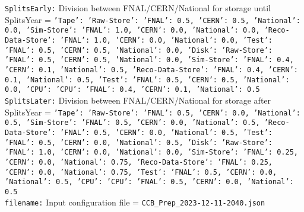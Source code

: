 {\tt SplitsEarly:} Division between FNAL/CERN/National for storage until SplitsYear = {\tt {'Tape': {'Raw-Store': {'FNAL': 0.5, 'CERN': 0.5, 'National': 0.0}, 'Sim-Store': {'FNAL': 1.0, 'CERN': 0.0, 'National': 0.0}, 'Reco-Data-Store': {'FNAL': 1.0, 'CERN': 0.0, 'National': 0.0}, 'Test': {'FNAL': 0.5, 'CERN': 0.5, 'National': 0.0}}, 'Disk': {'Raw-Store': {'FNAL': 0.5, 'CERN': 0.5, 'National': 0.0}, 'Sim-Store': {'FNAL': 0.4, 'CERN': 0.1, 'National': 0.5}, 'Reco-Data-Store': {'FNAL': 0.4, 'CERN': 0.1, 'National': 0.5}, 'Test': {'FNAL': 0.5, 'CERN': 0.5, 'National': 0.0}}, 'CPU': {'CPU': {'FNAL': 0.4, 'CERN': 0.1, 'National': 0.5}}}} \\
{\tt SplitsLater:} Division between FNAL/CERN/National for storage after SplitsYear = {\tt {'Tape': {'Raw-Store': {'FNAL': 0.5, 'CERN': 0.0, 'National': 0.5}, 'Sim-Store': {'FNAL': 0.5, 'CERN': 0.0, 'National': 0.5}, 'Reco-Data-Store': {'FNAL': 0.5, 'CERN': 0.0, 'National': 0.5}, 'Test': {'FNAL': 0.5, 'CERN': 0.0, 'National': 0.5}}, 'Disk': {'Raw-Store': {'FNAL': 1.0, 'CERN': 0.0, 'National': 0.0}, 'Sim-Store': {'FNAL': 0.25, 'CERN': 0.0, 'National': 0.75}, 'Reco-Data-Store': {'FNAL': 0.25, 'CERN': 0.0, 'National': 0.75}, 'Test': {'FNAL': 0.5, 'CERN': 0.0, 'National': 0.5}}, 'CPU': {'CPU': {'FNAL': 0.5, 'CERN': 0.0, 'National': 0.5}}}} \\
{\tt filename:} Input configuration file = {\tt CCB_Prep_2023-12-11-2040.json} \\
